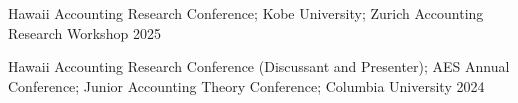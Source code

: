 

\begin{cventries}

\cventrylong
    {Hawaii Accounting Research Conference; Kobe University; Zurich Accounting Research Workshop}  %
    {2025} %
    {}
	
\cventrylong
	{Hawaii Accounting Research Conference (Discussant and Presenter); AES Annual Conference; Junior Accounting Theory Conference; Columbia University}  %
    {2024} %
    {}
    
\end{cventries}
